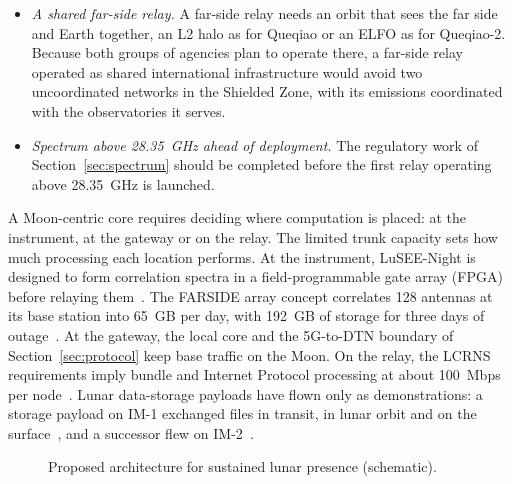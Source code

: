 \documentclass{IEEEoj}
\begin{document}
\begin{itemize}
\item \emph{A shared far-side relay.} A far-side relay needs an orbit that sees the far side and Earth together, an L2 halo as for Queqiao or an ELFO as for Queqiao-2. Because both groups of agencies plan to operate there, a far-side relay operated as shared international infrastructure would avoid two uncoordinated networks in the Shielded Zone, with its emissions coordinated with the observatories it serves.
\item \emph{Spectrum above \SI{28.35}{GHz} ahead of deployment.} The regulatory work of Section~\ref{sec:spectrum} should be completed before the first relay operating above \SI{28.35}{GHz} is launched.
\end{itemize}

A Moon-centric core requires deciding where computation is placed: at the instrument, at the gateway or on the relay. The limited trunk capacity sets how much processing each location performs. At the instrument, LuSEE-Night is designed to form correlation spectra in a field-programmable gate array (FPGA) before relaying them~\cite{bale_lusee_2023}. The FARSIDE array concept correlates 128 antennas at its base station into \SI{65}{GB} per day, with \SI{192}{GB} of storage for three days of outage~\cite{burns_farside_2019}. At the gateway, the local core and the 5G-to-DTN boundary of Section~\ref{sec:protocol} keep base traffic on the Moon. On the relay, the LCRNS requirements imply bundle and Internet Protocol processing at about \SI{100}{Mbps} per node~\cite{nasa_onboard_lunanet}. Lunar data-storage payloads have flown only as demonstrations: a storage payload on IM-1 exchanged files in transit, in lunar orbit and on the surface~\cite{dcd_lonestar_im1}, and a successor flew on IM-2~\cite{storagenl_freedom_2025,nasa_im2}.
\begin{figure}[!t]
\centering
\resizebox{0.9\textwidth}{!}{}
\caption{Proposed architecture for sustained lunar presence (schematic).}
\label{fig:architecture}
\end{figure}
\end{document}
